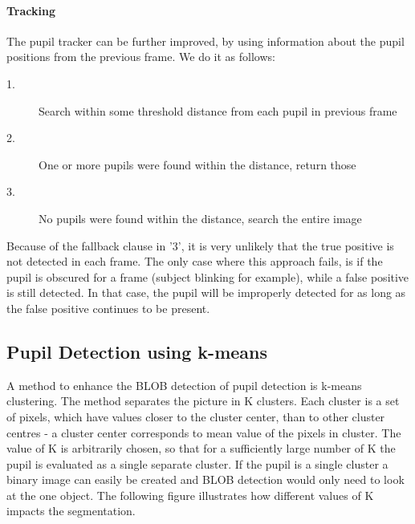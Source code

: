 \documentclass[a4paper,11pt]{article}
\begin{document}
\paragraph{Tracking} The pupil tracker can be further improved, by using information about the pupil positions from the previous frame. We do it as follows:
\begin{description}
\item[1.]{Search within some threshold distance from each pupil in previous frame}
\item[2.]{One or more pupils were found within the distance, return those}
\item[3.]{No pupils were found within the distance, search the entire image}
\end{description}
Because of the fallback clause in '3', it is very unlikely that the true positive is not detected in each frame. The only case where this approach fails, is if the pupil is obscured for a frame (subject blinking for example), while a false positive is still detected. In that case, the pupil will be improperly detected for as long as the false positive continues to be present.

\subsection{Pupil Detection using k-means}
A method to enhance the BLOB detection of pupil detection is k-means clustering. The method separates the picture in K clusters. Each cluster is a set of pixels, which have values closer to the cluster center, than to other cluster centres -  a cluster center corresponds to mean value of the pixels in cluster. The value of K is arbitrarily chosen, so that for a sufficiently large number of K the pupil is evaluated as a single separate cluster. If the pupil is a single cluster a binary image can easily be created and BLOB detection would only need to look at the one object. The following figure illustrates how different values of K impacts the segmentation.
\end{document}
